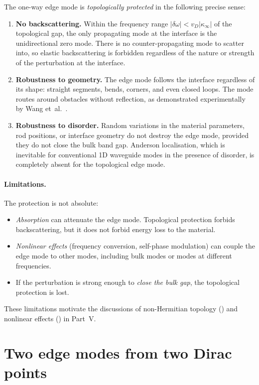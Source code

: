 The one-way edge mode is \emph{topologically protected} in the following
precise sense:
\begin{enumerate}
  \item \textbf{No backscattering.} Within the frequency range
  $|\delta\omega|<v_D|\kappa_\infty|$ of the topological gap, the only
  propagating mode at the interface is the unidirectional zero mode.
  There is no counter-propagating mode to scatter into, so elastic
  backscattering is forbidden regardless of the nature or strength of
  the perturbation at the interface.

  \item \textbf{Robustness to geometry.} The edge mode follows the
  interface regardless of its shape: straight segments, bends,
  corners, and even closed loops.  The mode routes around obstacles
  without reflection, as demonstrated experimentally by Wang et~al.\
  \cite{nature2026observation}.

  \item \textbf{Robustness to disorder.} Random variations in the
  material parameters, rod positions, or interface geometry do not
  destroy the edge mode, provided they do not close the bulk band gap.
  Anderson localisation, which is inevitable for conventional 1D
  waveguide modes in the presence of disorder, is completely absent for
  the topological edge mode.
\end{enumerate}

\paragraph{Limitations.}
The protection is not absolute:
\begin{itemize}
  \item \emph{Absorption} can attenuate the edge mode.  Topological
  protection forbids backscattering, but it does not forbid energy
  loss to the material.
  \item \emph{Nonlinear effects} (frequency conversion, self-phase
  modulation) can couple the edge mode to other modes, including bulk
  modes or modes at different frequencies.
  \item If the perturbation is strong enough to \emph{close the bulk
  gap}, the topological protection is lost.
\end{itemize}
These limitations motivate the discussions of non-Hermitian topology
(\chref{ch:non-hermitian}) and nonlinear effects
() in Part~V.

\section{Two edge modes from two Dirac points}
\label{sec:ch8-two-modes}

